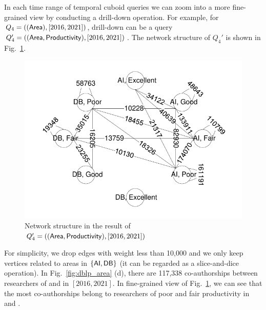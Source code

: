 \documentclass[10pt,journal,compsoc]{IEEEtran}
\begin{document}
In each time range of temporal cuboid queries we can zoom into a more fine-grained view by conducting a drill-down operation. For example, for $ Q_4=(({\mathsf{Area}}),[2016,2021]) $, drill-down can be a query $ Q_4'=(({\mathsf{Area}},{\mathsf{Productivity}}),[2016,2021]) $. The network structure of $ Q_4' $ is shown in Fig.~\ref{fig:dblp_area_pro_2016_2021}.
\begin{figure}
	\begin{center}
		\includegraphics[width=0.7\columnwidth]{fig/exp/visio_area_pro_2016_2021.pdf}
	\end{center}
	
	\vspace*{-0.6cm}
	\caption{Network structure in the result of $ Q_4'=(({\mathsf{Area}},{\mathsf{Productivity}}),[2016,2021]) $}
	\vspace*{-0.4cm}
	\label{fig:dblp_area_pro_2016_2021}
\end{figure}
For simplicity, we drop edges with weight less than 10,000 and we only keep vertices related to areas in $ \{{\mathsf{AI}},{\mathsf{DB}}\} $ (it can be regarded as a slice-and-dice operation). In Fig.~\ref{fig:dblp_area} (d), there are 117,338 co-authorships between researchers of  and  in $ [2016,2021] $. In fine-grained view of Fig.~\ref{fig:dblp_area_pro_2016_2021}, we can see that the most co-authorships belong to researchers of poor and fair productivity in  and .
\end{document}

